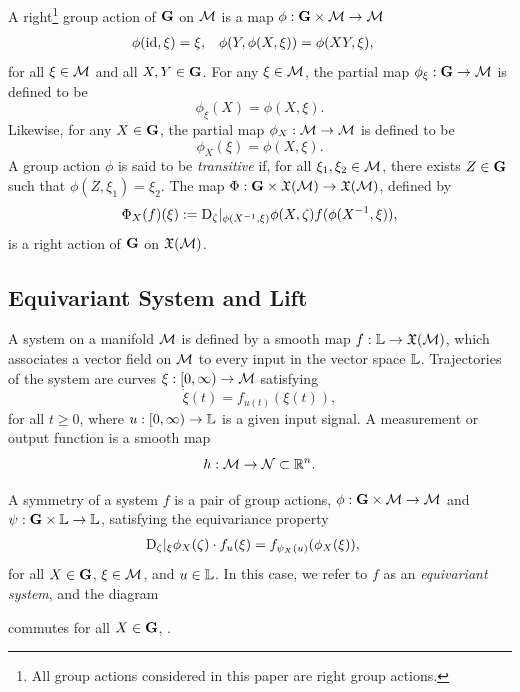 \documentclass{article}
\begin{document}
A right\footnote{All group actions considered in this paper are right group actions.} group action of $\mathbf{G}$ on $\mathcal{M}$ is a map $\phi : \mathbf{G} \times \mathcal{M} \to \mathcal{M}$ 
\begin{align*}
    \phi(\mathrm{id}, \xi) &= \xi, &
    \phi(Y, \phi(X, \xi)) &= \phi(X Y, \xi),
\end{align*}
for all $\xi \in \mathcal{M}$ and all $X,Y \in \mathbf{G}$.
For any $\xi \in \mathcal{M}$, the partial map $\phi_\xi : \mathbf{G} \to \mathcal{M}$ is defined to be 
$$\phi_\xi(X) = \phi(X, \xi).$$
Likewise, for any $X \in \mathbf{G}$, the partial map $\phi_X : \mathcal{M} \to \mathcal{M}$ is defined to be 
$$\phi_X(\xi) = \phi(X, \xi).$$
A group action $\phi$ is said to be \emph{transitive} if, for all $\xi_1, \xi_2 \in \mathcal{M}$, there exists $Z \in \mathbf{G}$ such that $\phi(Z, \xi_1) = \xi_2$.
The map $\Phi : \mathbf{G} \times \mathfrak{X}(\mathcal{M}) \to \mathfrak{X}(\mathcal{M})$, defined by
\begin{align*}
    \Phi_X(f)(\xi) := \mathrm{D}_\zeta |_{\phi(X^{-1}, \xi)} \phi(X, \zeta) f(\phi(X^{-1}, \xi)),
\end{align*}
is a right action of $\mathbf{G}$ on $\mathfrak{X}(\mathcal{M})$.


\subsection{Equivariant System and Lift}

A system on a manifold $\mathcal{M}$ is defined by a smooth map $f : \mathbb{L} \to \mathfrak{X}(\mathcal{M})$, which associates a vector field on $\mathcal{M}$ to every input in the vector space $\mathbb{L}$.
Trajectories of the system are curves $\xi : [0, \infty) \to \mathcal{M}$ satisfying 
$$\dot{\xi}(t) = f_{u(t)}(\xi(t)),$$
for all $t \geq 0$, where $u:[0,\infty) \to \mathbb{L}$ is a given input signal.
A measurement or output function is a smooth map 
$$h : \mathcal{M} \to \mathcal{N} \subset \mathbb{R}^n.$$

A symmetry of a system $f$ is a pair of group actions, $\phi : \mathbf{G} \times \mathcal{M} \to \mathcal{M}$ and $\psi : \mathbf{G} \times \mathbb{L} \to \mathbb{L}$, satisfying the equivariance property
\begin{align}
    \mathrm{D}_\zeta |_\xi \phi_X (\zeta) \cdot f_u(\xi) &= f_{\psi_X(u)}(\phi_X(\xi)),
\end{align}
for all $X \in \mathbf{G}$, $\xi \in \mathcal{M}$, and $u \in \mathbb{L}$.
In this case, we refer to $f$ as an \emph{equivariant system}, and the diagram

commutes for all $X \in \mathbf{G}$, .
\end{document}
